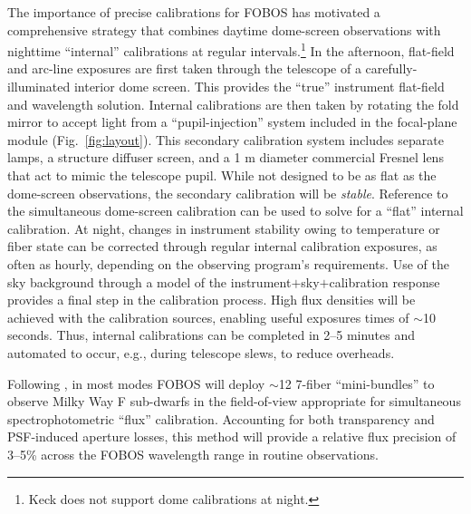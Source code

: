 \documentclass[oneside,11pt]{amsart}
\begin{document}
The importance of precise calibrations for FOBOS has motivated a comprehensive strategy that combines daytime dome-screen observations with nighttime ``internal'' calibrations at regular intervals.\footnote{Keck does not support dome calibrations at night.}  In the afternoon, flat-field and arc-line exposures are first taken through the telescope of a carefully-illuminated interior dome screen.  This provides the ``true'' instrument flat-field and wavelength solution.  Internal calibrations are then taken by rotating the fold mirror to accept light from a ``pupil-injection'' system included in the focal-plane module (Fig.~\ref{fig:layout}).  This secondary calibration system includes separate lamps, a structure diffuser screen, and a 1 m diameter commercial Fresnel lens that act to mimic the telescope pupil.  While not designed to be as flat as the dome-screen observations, the secondary calibration will be \emph{stable}.  Reference to the simultaneous dome-screen calibration can be used to solve for a ``flat'' internal calibration.  At night, changes in instrument stability owing to temperature or fiber state can be corrected through regular internal calibration exposures, as often as hourly, depending on the observing program's requirements.  Use of the sky background through a model of the instrument$+$sky$+$calibration response provides a final step in the calibration process.  High flux densities will be achieved with the calibration sources, enabling useful exposures times of $\sim$10 seconds.  Thus, internal calibrations can be completed in 2--5 minutes and automated to occur, e.g., during telescope slews, to reduce overheads.


Following \citet{yan16}, in most modes FOBOS will deploy $\sim$12 7-fiber ``mini-bundles'' to observe Milky Way F sub-dwarfs in the field-of-view appropriate for simultaneous spectrophotometric ``flux'' calibration.  Accounting for both transparency and PSF-induced aperture losses, this method will provide a relative flux precision of 3--5\% across the FOBOS wavelength range in routine observations.
\end{document}
